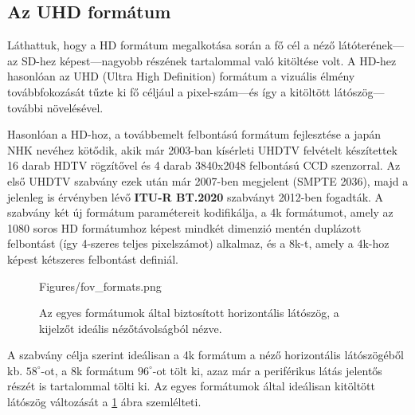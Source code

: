\subsection{Az UHD formátum}

Láthattuk, hogy a HD formátum megalkotása során a fő cél a néző látóterének---az SD-hez képest---nagyobb részének tartalommal való kitöltése volt.
A HD-hez hasonlóan az UHD (Ultra High Definition) formátum a vizuális élmény továbbfokozását tűzte ki fő céljául a pixel-szám---és így a kitöltött látószög---további növelésével.

Hasonlóan a HD-hoz, a továbbemelt felbontású formátum fejlesztése a japán NHK nevéhez kötődik, akik már 2003-ban kísérleti UHDTV felvételt készítettek 16 darab HDTV rögzítővel és 4 darab 3840x2048 felbontású CCD szenzorral.
Az első UHDTV szabvány ezek után már 2007-ben megjelent (SMPTE 2036), majd a jelenleg is érvényben lévő \textbf{ITU-R BT.2020} szabványt 2012-ben fogadták.
A szabvány két új formátum paramétereit kodifikálja, a 4k formátumot, amely az 1080 soros HD formátumhoz képest mindkét dimenzió mentén duplázott felbontást (így 4-szeres teljes pixelszámot) alkalmaz, és a 8k-t, amely a 4k-hoz képest kétszeres felbontást definiál.
\begin{figure}[]
	\centering
	\begin{overpic}[width = 0.85 \columnwidth ]{Figures/fov_formats.png}
	\small
	\end{overpic}
	\caption{Az egyes formátumok által biztosított horizontális látószög, a kijelzőt ideális nézőtávolságból nézve.}
	\label{Fig:fov_formats}
\end{figure}

A szabvány célja szerint ideálisan a 4k formátum a néző horizontális látószögéből kb. $58^{\circ}$-ot, a 8k formátum $96^{\circ}$-ot tölt ki, azaz már a periférikus látás jelentős részét is tartalommal tölti ki.
Az egyes formátumok által ideálisan kitöltött látószög változását a \ref{Fig:fov_formats} ábra szemlélteti.

